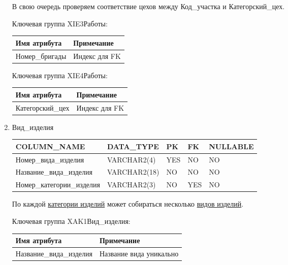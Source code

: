 \begin{enumerate}
    В свою очередь проверяем соответствие цехов между Код\_участка и Категорский\_цех.

    Ключевая группа XIE3Работы:

    \begin{tabular}{|p{7cm}|p{9.3cm}|} \hline

        {\bf Имя атрибута} & {\bf Примечание} \\ \hline
        Номер\_бригады & Индекс для FK \\ \hline

    \end{tabular}

    Ключевая группа XIE4Работы:

    \begin{tabular}{|p{7cm}|p{9.3cm}|} \hline

        {\bf Имя атрибута} & {\bf Примечание} \\ \hline
        Категорский\_цех & Индекс для FK \\ \hline

    \end{tabular}

    \item{Вид\_изделия}

    \begin{tabular}{|p{7cm}|p{3cm}|p{1cm}|p{1cm}|p{3cm}|} \hline

        {\bf COLUMN\_NAME} & {\bf DATA\_TYPE} & {\bf PK} & {\bf FK} & {\bf NULLABLE} \\ \hline
        Номер\_вида\_изделия & VARCHAR2(4) & YES & NO & NO \\ \hline
        Название\_вида\_изделия & VARCHAR2(18) & NO & NO & NO \\ \hline
        Номер\_категории\_изделия & VARCHAR2(3) & NO & YES & NO \\ \hline

    \end{tabular}

    По каждой \underline{категории изделий} может собираться несколько \underline{видов изделий}.

    Ключевая группа XAK1Вид\_изделия:

    \begin{tabular}{|p{7cm}|p{9.3cm}|} \hline

        {\bf Имя атрибута} & {\bf Примечание} \\ \hline
        Название\_вида\_изделия & Название вида уникально \\ \hline


\end{tabular}
\end{enumerate}
